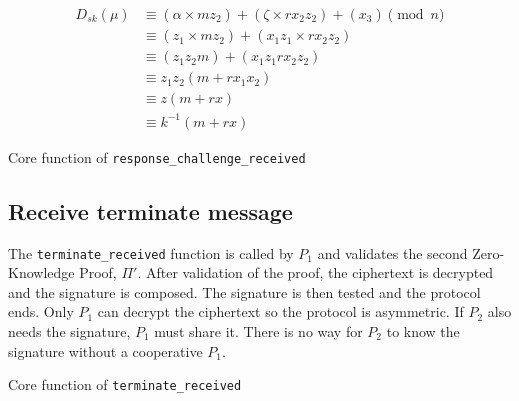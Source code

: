 \begin{equation}
\begin{split}
  D_{sk}(\mu) &\equiv (\alpha \times mz_2) + (\zeta \times rx_2z_2) + (x_3) \pmod n \\
              &\equiv (z_1 \times mz_2) + (x_1z_1 \times rx_2z_2)  \\
              &\equiv (z_1z_2m) + (x_1z_1rx_2z_2)  \\
              &\equiv z_1z_2(m + rx_1x_2)  \\
              &\equiv z(m + rx)  \\
              &\equiv k^{-1}(m + rx)
\end{split}
\end{equation}

\begin{longlisting}
	\caption{Core function of \texttt{response\_challenge\_received}}
	\label{lst:implRespChallengeReceivedFunc}
\end{longlisting}

\subsection{Receive terminate message}

The \texttt{terminate\_received} function is called by $P_1$ and validates the
second Zero-Knowledge Proof, $\Pi'$. After validation of the proof, the
ciphertext is decrypted and the signature is composed. The signature is then
tested and the protocol ends. Only $P_1$ can decrypt the ciphertext so the
protocol is asymmetric. If $P_2$ also needs the signature, $P_1$ must share it.
There is no way for $P_2$ to know the signature without a cooperative $P_1$.

\begin{longlisting}
	\caption{Core function of \texttt{terminate\_received}}
	\label{lst:implTerminateReceivedFunc}
\end{longlisting}
